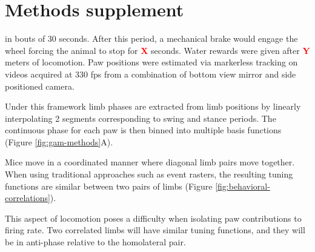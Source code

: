 \section{Methods supplement}
% 

in bouts of 30 seconds. After this period, a mechanical brake would engage the wheel forcing the animal to stop for \textbf{\textcolor{red}{X}} seconds. Water rewards were given after \textbf{\textcolor{red}{Y}} meters of locomotion. Paw positions were estimated via markerless tracking on videos acquired at 330 fps from a combination of bottom view mirror and side positioned camera.

Under this framework limb phases are extracted from limb positions by linearly interpolating 2 segments corresponding to swing and stance periods. The continuous phase for each paw is then binned into multiple basis functions (Figure \ref{fig:gam-methods}A).


Mice move in a coordinated manner where diagonal limb pairs move together. When using traditional approaches such as event rasters, the resulting tuning functions are similar between two pairs of limbs (Figure \ref{fig:behavioral-correlations}).

\par This aspect of locomotion poses a difficulty when isolating paw contributions to firing rate. Two correlated limbs will have similar tuning functions, and they will be in anti-phase relative to the homolateral pair.


